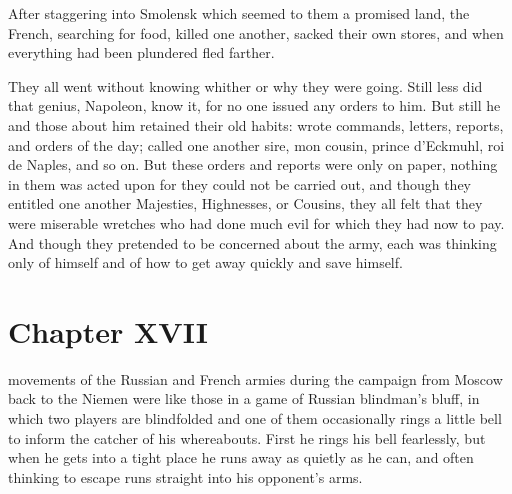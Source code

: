 After staggering into Smolensk which seemed to them a promised
land, the French, searching for food, killed one another, sacked
their own stores, and when everything had been plundered fled
farther.

They all went without knowing whither or why they were
going. Still less did that genius, Napoleon, know it, for no one
issued any orders to him.  But still he and those about him
retained their old habits: wrote commands, letters, reports, and
orders of the day; called one another sire, mon cousin, prince
d'Eckmuhl, roi de Naples, and so on. But these orders and reports
were only on paper, nothing in them was acted upon for they could
not be carried out, and though they entitled one another
Majesties, Highnesses, or Cousins, they all felt that they were
miserable wretches who had done much evil for which they had now
to pay.  And though they pretended to be concerned about the
army, each was thinking only of himself and of how to get away
quickly and save himself.


\chapter*{Chapter XVII} \ifaudio {}
\fi

 movements of the Russian and French armies during the
campaign from Moscow back to the Niemen were like those in a game
of Russian blindman's bluff, in which two players are blindfolded
and one of them occasionally rings a little bell to inform the
catcher of his whereabouts. First he rings his bell fearlessly,
but when he gets into a tight place he runs away as quietly as he
can, and often thinking to escape runs straight into his
opponent's arms.

